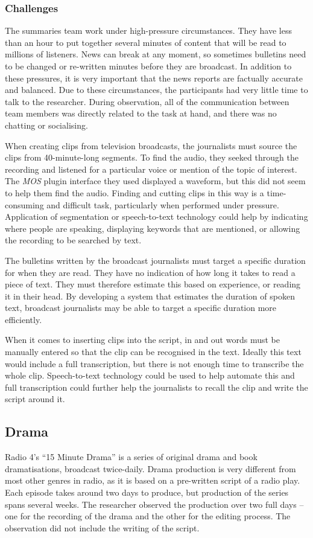 \subsubsection{Challenges}

The summaries team work under high-pressure circumstances. They have less than an hour to put together several minutes
of content that will be read to millions of listeners. News can break at any moment, so sometimes bulletins need to be
changed or re-written minutes before they are broadcast. In addition to these pressures, it is very important that the
news reports are factually accurate and balanced.  Due to these circumstances, the participants had very little time to
talk to the researcher. During observation, all of the communication between team members was directly related to the
task at hand, and there was no chatting or socialising.

When creating clips from television broadcasts, the journalists must source the clips from 40-minute-long
segments.  To find the audio, they seeked through the recording and listened for a particular voice or mention of the
topic of interest.  The \textit{MOS} plugin interface they used displayed a waveform, but this did not seem to help
them find the audio.  Finding and cutting clips in this way is a time-consuming and difficult task, particularly when
performed under pressure.  Application of segmentation or speech-to-text technology could help by indicating where
people are speaking, displaying keywords that are mentioned, or allowing the recording to be searched by text.

The bulletins written by the broadcast journalists must target a specific duration for when they are read.  They have
no indication of how long it takes to read a piece of text. They must therefore estimate this based on experience, or
reading it in their head.  By developing a system that estimates the duration of spoken text, broadcast journalists may
be able to target a specific duration more efficiently. 

When it comes to inserting clips into the script, in and out words must be manually entered so that the clip can be
recognised in the text. Ideally this text would include a full transcription, but there is not enough time to
transcribe the whole clip.  Speech-to-text technology could be used to help automate this and full transcription could
further help the journalists to recall the clip and write the script around it.

\subsection{Drama}\label{sec:drama}
Radio 4's ``15 Minute Drama'' is a series of original drama and book dramatisations, broadcast twice-daily. Drama
production is very different from most other genres in radio, as it is based on a pre-written script of a radio play.
Each episode takes around two days to produce, but production of the series spans several weeks.  The researcher
observed the production over two full days -- one for the recording of the drama and the other for the editing process.
The observation did not include the writing of the script.


